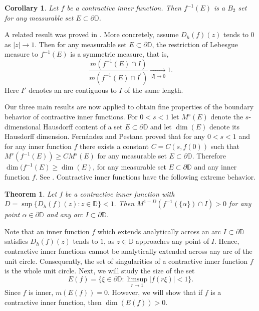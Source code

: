 \documentclass[a4paper,12pt]{article}
\newtheorem{theorem}{Theorem}[section]
\newtheorem{cor}{Corollary}[section]
\theoremstyle{definition}
\numberwithin{equation}{section}
\newcommand{\D}{\mathbb D}
\begin{document}
\begin{cor}\label{cor1}
Let $f$ be a contractive inner function. Then $f^{-1}(E)$ is a $B_2$ set for any measurable set $E \subset \partial \mathbb{D}$. 
\end{cor}

A related result was proved in \cite{AAN}.  More concretely, assume $D_h (f) (z)$ tends to $0$ as $|z| \to 1$. Then for any measurable set $E \subset \partial \mathbb{D}$, the restriction of Lebesgue measure to $f^{-1} (E)$ is a symmetric measure, that is,  
$$
\frac{m\left(f^{-1}(E) \cap I\right)}{m\left(f^{-1}(E) \cap I^{\prime}\right)} \xrightarrow[|I| \rightarrow 0]{ } 1 .
$$
Here $I'$ denotes an arc contiguous to $I$ of the same length. 

\vspace{0.2cm}

Our three main results are now applied to obtain fine properties of the boundary behavior of contractive inner functions. For $0<s<1$ let $M^{s}(E)$ denote the $s$-dimensional Hausdorff content of a set $E \subset \partial \mathbb{D}$ and let $ \operatorname{dim} (E)$ denote its Hausdorff dimension. Fern\'andez and Pestana proved that for any $0<s<1$ and for any inner function $f$ there exists a constant $C=C(s,f(0))$ such that $M^s (f^{-1} (E)) \geq C M^s (E)$ for any measurable set $E \subset \partial \D$. Therefore $\operatorname{dim} (f^{-1} (E) \geq \operatorname{dim} (E)$, for any measurable set $E \subset \partial \D$ and any inner function $f$. See \cite{FP}. Contractive inner functions have the following extreme behavior.    

\begin{theorem}
\label{preimage}
Let $f$ be a contractive inner function with
$
D=\sup \{ D_h (f) (z) : z \in  \mathbb{D}\} <1 .
$
Then $M^{1-D} ( f^{-1} ( \{\alpha \})  \cap I)  >0$ for any point  $\alpha \in \partial \mathbb{D}$ and any arc $I \subset \partial \mathbb{D}$.
\end{theorem}

Note that an inner function $f$ which extends analytically across an arc $I \subset \partial \D$ satisfies $D_h (f) (z)$ tends to $1$, as $z \in \D$ approaches any point of $I$. Hence, contractive inner functions cannot be analytically extended across any arc of the unit circle. Consequently, the set of singularities of a contractive inner function $f$ is the whole unit circle. Next, we will study the size of the set 
$$
E(f)= \{ \xi \in \partial \mathbb{D} : \limsup_{r \rightarrow 1}|f(r \xi)|<1 \}. 
$$
Since $f$ is inner, $m(E(f))=0$. However, we will show that if $f$ is a contractive inner function, then $\operatorname{dim}(E(f)) >0$. 
\end{document}
